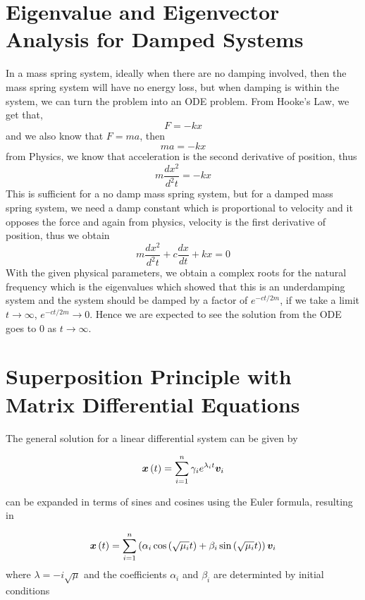 \documentclass[10pt,a4paper]{article}
\renewcommand{\vec}[1]{\boldsymbol{#1}}
\begin{document}
\begin{multicols*}{2}
\section*{Eigenvalue and Eigenvector Analysis for Damped Systems}

In a mass spring system, ideally when there are no damping involved, then the mass spring system will have no energy loss, but when damping is within the system, we can turn the problem into an ODE problem. From Hooke's Law, we get that, 
$$F = -kx$$
and we also know that $F = ma$, then 
$$ma = -kx$$
from Physics, we know that acceleration is the second derivative of position, thus 
$$ m \frac{dx^2}{d^2t} = -kx $$
This is sufficient for a no damp mass spring system, but for a damped mass spring system, we need a damp constant which is proportional to velocity and it opposes the force and again from physics, velocity is the first derivative of position, thus we obtain 
$$ m \frac{dx^2}{d^2t} + c \frac{dx}{dt} + kx = 0$$
With the given physical parameters, we obtain a complex roots for the natural frequency which is the eigenvalues which showed that this is an underdamping system and the system should be damped by a factor of $e^{-ct/2m}$, if we take a limit $t \rightarrow \infty$, $e^{-ct/2m} \rightarrow 0$. Hence we are expected to see the solution from the ODE goes to $0$ as $t \rightarrow \infty$.

\section*{Superposition Principle with Matrix Differential Equations}

The general solution for a linear differential system can be given by

\begin{equation}
	\vec{x}\paren{t} = \sum\limits_{i=1}^n \gamma_i e^{\lambda_i t} \vec{v}_i
	\label{eqn: Superposition}
\end{equation}

 can be expanded in terms of sines and cosines using the Euler formula, resulting in

\begin{equation}
	\vec{x}\paren{t} = \sum\limits_{i=1}^n \paren{\alpha_i \cos{\paren{\sqrt{\mu_i} t}} + \beta_i \sin{\paren{\sqrt{\mu_i} t}}} \vec{v}_i
\end{equation}
where $\lambda = -i\sqrt{\mu}$ and the coefficients $\alpha_i$ and $\beta_i$ are determinted by initial conditions


\end{multicols*}
\end{document}
